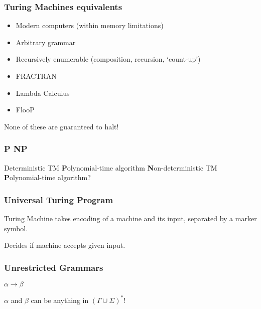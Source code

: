 \documentclass[languages_and_machines.tex]{subfiles}
\begin{document}
\begin{frame}
  \frametitle{Turing Machines equivalents}

  \begin{itemize}
  \item Modern computers (within memory limitations)
    \pause
  \item Arbitrary grammar
    \pause
  \item Recursively enumerable (composition, recursion, `count-up')
    \pause
  \item FRACTRAN
    \pause
  \item Lambda Calculus
    \pause
  \item FlooP
  \end{itemize}

  None of these are guaranteed to halt!

\end{frame}

\begin{frame}
  \frametitle{P  NP}

  Deterministic TM \textbf{P}olynomial-time algorithm
  \textbf{N}on-deterministic TM \textbf{P}olynomial-time algorithm?
\end{frame}

\begin{frame}
  \frametitle{Universal Turing Program}

  Turing Machine takes encoding of a machine and its input, separated by a marker symbol.

  Decides if machine accepts given input.
\end{frame}



\begin{frame}
  \frametitle{Unrestricted Grammars}

  \(\alpha \to \beta\)

  \(\alpha\) and \(\beta\) can be anything in \((\Gamma \cup \Sigma)^*\)!
\end{frame}
\end{document}
